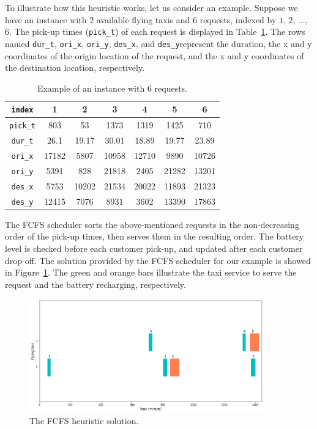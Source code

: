 To illustrate how this heuristic works, let us consider an example. Suppose we have an instance with $2$ available flying taxis and $6$ requests, indexed by $1$, $2$, ..., $6$. The pick-up times (\texttt{pick\_t}) of each request is displayed in Table~\ref{tab:fcfs-exp}. The rows named \og\texttt{dur\_t}\fg, \og\texttt{ori\_x}\fg, \og\texttt{ori\_y}\fg, \og\texttt{des\_x}\fg, and \og\texttt{des\_y}\fg represent the duration, the x and y coordinates of the origin location of the request, and the x and y coordinates of the destination location, respectively.
\begin{table}
	\centering
	\begin{tabular}{ccccccc}
		\toprule
		\texttt{index}  &1     &  2    &    3  &    4  &    5   &   6\\
		\midrule
		\texttt{pick\_t}&   803 & 53    &  1373 &  1319 &  1425 &   710\\
		\texttt{dur\_t} &  26.1 & 19.17 &  30.01& 18.89 & 19.77 & 23.89\\
		\texttt{ori\_x} & 17182 &  5807 & 10958 & 12710 &  9890 & 10726\\
		\texttt{ori\_y} &  5391 &   828 & 21818 &  2405 & 21282 & 13201\\
		\texttt{des\_x} &  5753 & 10202 & 21534 & 20022 & 11893 & 21323\\
		\texttt{des\_y} & 12415 &  7076 &  8931 &  3602 & 13390 & 17863\\	
		\bottomrule
	\end{tabular}
	\caption{Example of an instance with $6$ requests.}
	\label{tab:fcfs-exp}
\end{table}

The \acs{FCFS} scheduler sorts the above-mentioned requests in the non-decreasing order of the pick-up times, then serves them in the resulting order. The battery level is checked before each customer pick-up, and updated after each customer drop-off. The solution provided by the \acs{FCFS} scheduler for our example is showed in Figure~\ref{fig:example-fcfs}. The green and orange bars illustrate the taxi service to serve the request and the battery recharging, respectively. 
\begin{figure}[h!]
	\centering
	\includegraphics[width=0.9\textwidth]{images/example-fcfs}
	\caption{The \acs{FCFS} heuristic solution.}
	\label{fig:example-fcfs}
\end{figure}


